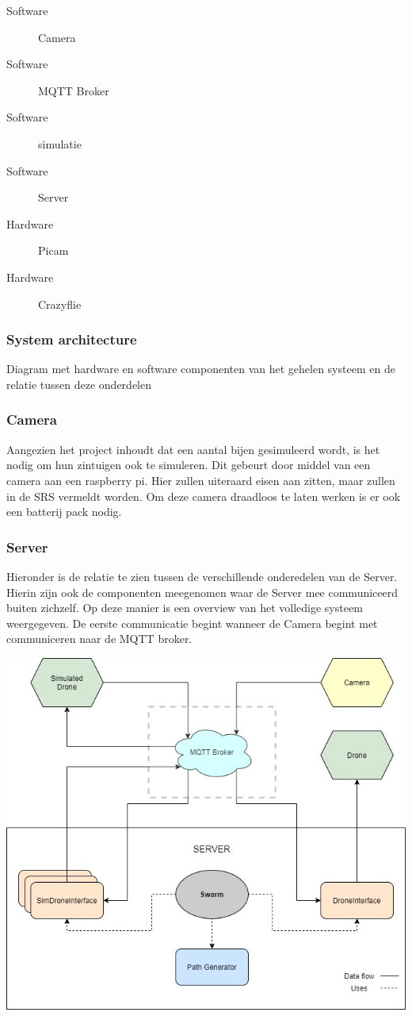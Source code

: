 \begin{description}
    \item[Software] Camera
    \item[Software] MQTT Broker
    \item[Software] simulatie
    \item[Software] Server
    \item[Hardware] Picam
    \item[Hardware] Crazyflie
\end{description}

\subsubsection{System architecture}
Diagram met hardware en software componenten van het gehelen systeem en de relatie tussen deze onderdelen
\subsubsection*{Camera}
Aangezien het project inhoudt dat een aantal bijen gesimuleerd wordt, is het nodig om hun zintuigen ook te simuleren. Dit gebeurt door middel van een camera aan een raspberry pi. Hier zullen uiteraard eisen aan zitten, maar zullen in de SRS vermeldt worden. Om deze camera draadloos te laten werken is er ook een batterij pack nodig.

\subsubsection*{Server}
Hieronder is de relatie te zien tussen de verschillende onderedelen van de Server. Hierin zijn ook de componenten meegenomen waar de Server mee communiceerd buiten zichzelf. Op deze manier is een overview van het volledige systeem weergegeven.
De eerste communicatie begint wanneer de Camera begint met communiceren naar de MQTT broker.
\begin{center}
    \includegraphics[scale=0.5]{../IMAGES/ServerV3.jpg}
\end{center}




